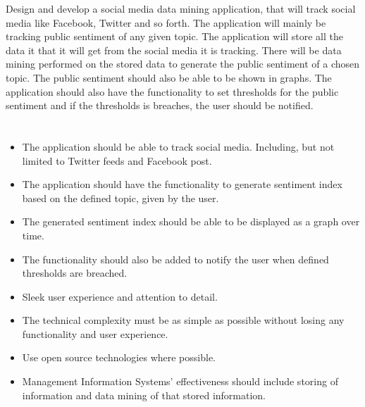 \documentclass[letterpaper]{article}
\begin{document}
		\vspace{0.2in}
		
		Design and develop a social media data mining application, that will track social media like 				Facebook, Twitter and so forth. The application will mainly be tracking public sentiment of any 			given topic. The application will store all the data it that it will get from the social media it 			is tracking. There will be data mining performed on the stored data to generate the public 					sentiment of a chosen topic. The public sentiment should also be able to be shown in graphs. The 			application should also have the functionality to set thresholds for the public sentiment and if 			the thresholds is breaches, the user should be notified.
		
		\vspace{0.2in}
		
		\section*{\colorbox{blue}{}} 
		
		\vspace{0.2in}
		
		\begin{itemize}
		\item
		The application should be able to track social media. Including, but not limited to Twitter feeds 			and Facebook post.
		\item
		The application should have the functionality to generate sentiment index based on the defined 				topic, given by the user.
		\item
		The generated sentiment index should be able to be displayed as a graph over time.
		\item
		The functionality should also be added to notify the user when defined thresholds are breached.
		\item
		Sleek user experience and attention to detail.
		\item
		The technical complexity must be as simple as possible without losing any functionality and user 			experience.
		\item
		Use open source technologies where possible.
		\item
		Management Information Systems' effectiveness should include storing of information and data 				mining of that stored information. 
		\end{itemize}
		
\end{document}
